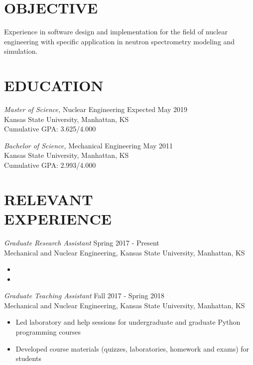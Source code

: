 \documentclass[margin, 10pt]{res} %
\begin{document}
\begin{resume}
 
\section{OBJECTIVE}  

Experience in software design and implementation for the field of nuclear engineering with specific application in neutron spectrometry modeling and simulation.

\section{EDUCATION}

{\sl Master of Science,} Nuclear Engineering \hfill Expected May 2019\\
Kansas State University, Manhattan, KS \\
Cumulative GPA: 3.625/4.000

{\sl Bachelor of Science,} Mechanical Engineering \hfill May 2011 \\
Kansas State University, Manhattan, KS \\
Cumulative GPA: 2.993/4.000


\section{RELEVANT \\ EXPERIENCE}

{\sl Graduate Research Assistant} \hfill Spring 2017 - Present \\
Mechanical and Nuclear Engineering, Kansas State University, Manhattan, KS
\begin{itemize}
    \item
    \item
\end{itemize}

{\sl Graduate Teaching Assistant} \hfill Fall 2017 - Spring 2018 \\
Mechanical and Nuclear Engineering, Kansas State University, Manhattan, KS \\
\begin{itemize} \itemsep -2pt %
    \item Led laboratory and help sessions for undergraduate and graduate Python programming courses
    \item Developed course materials (quizzes, laboratories, homework and exams) for students
\end{itemize}



\end{resume}
\end{document}
